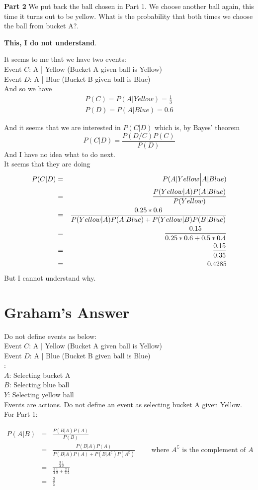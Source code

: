 \documentclass{article}
\newcommand{\beq}{\begin{equation}}
\newcommand{\eeq}{\end{equation}}
\newcommand{\ber}{\begin{eqnarray}}
\newcommand{\eer}{\end{eqnarray}}
\begin{document}
{\textbf{Part 2}} We put back the ball chosen in Part 1. We choose another ball again, this time it turns out to be yellow. What is the probability that both times we choose the ball from bucket A?.

{\textbf{This, I do not understand}}.

It seems to me that we have two events:\\
Event $C$: A | Yellow  (Bucket A given ball is Yellow) \\
Event $D$: A | Blue    (Bucket B given ball is Blue)\\
And so we have\\
\ber
P(C) = P(A|Yellow) = \frac{1}{3} \\
P(D) = P(A|Blue)   = 0.6
\eer

And it seems that we are interested in $P(C|D)$ which is, by Bayes' theorem
\beq
P(C|D) = \frac{P(D/C)P(C)}{P(D)}
\eeq
And I have no idea what to do next.\\

It seems that they are doing 
\ber
P(C|D)&=&P(A|Yellow\Big{|}A|Blue)\\
&=& \frac{P(Yellow|A)P(A|Blue)}{P(Yellow)} \\
&=& \frac{0.25*0.6}{P(Yellow|A)P(A|Blue)+P(Yellow|B)P(B|Blue)} \\
      &=& \frac{0.15}{0.25*0.6+0.5*0.4} \\
      &=& \frac{0.15}{0.35} \\
      &=& 0.4285
\eer
But I cannot understand why.
\section{ Graham's Answer}
Do not define events as below:\\
Event $C$: A | Yellow  (Bucket A given ball is Yellow) \\
Event $D$: A | Blue    (Bucket B given ball is Blue)\\

:\\
$A$: Selecting bucket A \\
$B$: Selecting blue ball \\
$Y$: Selecting yellow ball \\

\noindent Events are actions. Do not define an event as selecting bucket A given Yellow.\\

For Part 1:

\ber
P(A|B) &=& \frac{P(B|A)P(A)}{P(B)} \\
&=& \frac{P(B|A)P(A)}{P(B|A)P(A) + P(B|A^\complement)P(A^\complement)} \qquad \text{ where  } A^\complement \text{ is the complement of } A \\
&=& \frac{\frac{3}{4}\frac{1}{2}}{\frac{3}{4}\frac{1}{2}+\frac{2}{4}\frac{1}{2}}\\
&=& \frac{3}{5}
\eer
\end{document}
